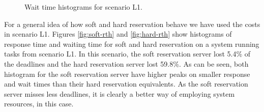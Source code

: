 \documentclass[times, 10pt,twocolumn]{article}
\begin{document}
\begin{figure}[t]
  \centering
  \caption{Wait time histograms for scenario L1.}
  \label{fig:dth}
\end{figure}

For a general idea of how soft and hard reservation behave we have
used the costs in scenario L1. Figures \ref{fig:soft-rth} and
\ref{fig:hard-rth} show histograms of response time and waiting time
for soft and hard reservation on a system running tasks from scenario
L1. In this scenario, the soft reservation server lost 5.4\% of the
deadlines and the hard reservation server lost 59.8\%. As can be seen,
both histogram for the soft reservation server have higher peaks on
smaller response and wait times than their hard reservation
equivalents. As the soft reservation server misses less deadlines, it
is clearly a better way of employing system resources, in this case.
\end{document}
